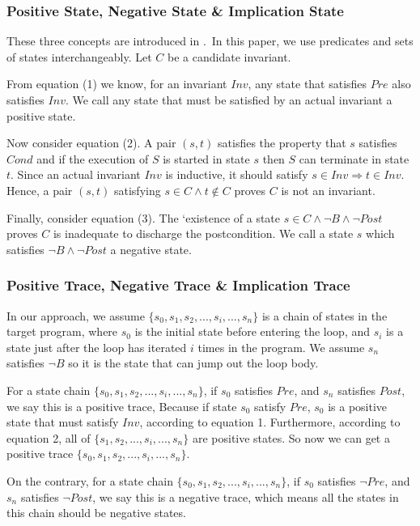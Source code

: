 \subsubsection*{Positive State, Negative State \& Implication State}

These three concepts are introduced in \cite{sharma2014invariant}.\
In this paper, we use predicates and sets of states interchangeably.
Let $C$ be a candidate invariant.

From equation (1) we know, for an invariant $Inv$, 
any state that satisfies $Pre$ also satisfies $Inv$. 
We call any state that must be satisfied by an actual invariant a positive state. 


Now consider equation (2).
A pair $(s, t)$ satisfies the property that $s$ satisfies $Cond$ and if the execution of $S$
is started in state $s$ then $S$ can terminate in state $t$. 
Since an actual invariant $Inv$ is inductive, it should satisfy $s \in Inv \Rightarrow t \in {Inv}$. 
Hence, a pair $(s, t)$ satisfying $s \in C \land t \notin C$ proves $C$ is not an invariant. 

Finally, consider equation (3).
The `existence of a state $s \in C \wedge \neg B \wedge \neg Post$ proves $C$ is inadequate to discharge the postcondition. 
We call a state $s$ which satisfies $\neg{B} \land \neg{Post}$ a negative state. 



\subsubsection*{Positive Trace, Negative Trace \& Implication Trace}
In our approach, we assume $\{s_0, s_1, s_2, ..., s_i, ... , s_n\}$ is a chain of states in the target program,
where $s_0$ is the initial state before entering the loop, 
and $s_i$ is a state just after the loop has iterated $i$ times in the program.
We assume $s_n$ satisfies $\neg B$ so it is the state that can jump out the loop body.



For a state chain $\{s_0, s_1, s_2, ..., s_i, ... , s_n\}$, 
if $s_0$ satisfies $Pre$, and $s_n$ satisfies $Post$,
we say this is a positive trace,
Because if state $s_0$ satisfy $Pre$,
$s_0$ is a positive state that must satisfy $Inv$, according to equation 1.
Furthermore, according to equation 2,
all of $\{s_1, s_2, ..., s_i, ... , s_n\}$ are positive states.
So now we can get a positive trace  $\{s_0, s_1, s_2, ..., s_i, ... , s_n\}$.


On the contrary, for a state chain $\{s_0, s_1, s_2, ..., s_i, ... , s_n\}$, 
if $s_0$ satisfies $\neg Pre$, and $s_n$ satisfies $\neg Post$,
we say this is a negative trace, 
which means all the states in this chain should be negative states.  

